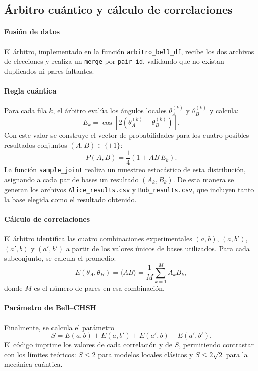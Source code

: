 \documentclass[11pt]{article}
\begin{document}
\subsection{Árbitro cuántico y cálculo de correlaciones}

\paragraph{Fusión de datos}
El árbitro, implementado en la función \texttt{arbitro\_bell\_df}, recibe los dos archivos de elecciones y realiza un \texttt{merge} por \texttt{pair\_id}, validando que no existan duplicados ni pares faltantes.

\paragraph{Regla cuántica}
Para cada fila $k$, el árbitro evalúa los ángulos locales $\theta_A^{(k)}$ y $\theta_B^{(k)}$ y calcula:
\[
E_k = \cos \left[ 2(\theta_A^{(k)} - \theta_B^{(k)}) \right].
\]
Con este valor se construye el vector de probabilidades para los cuatro posibles resultados conjuntos $(A,B) \in \{\pm1\}$:
\[
P(A,B) = \frac{1}{4} \left( 1 + AB \, E_k \right).
\]
La función \texttt{sample\_joint} realiza un muestreo estocástico de esta distribución, asignando a cada par de bases un resultado $(A_k, B_k)$. De esta manera se generan los archivos \texttt{Alice\_results.csv} y \texttt{Bob\_results.csv}, que incluyen tanto la base elegida como el resultado obtenido.

\paragraph{Cálculo de correlaciones}
El árbitro identifica las cuatro combinaciones experimentales $(a,b)$, $(a,b')$, $(a',b)$ y $(a',b')$ a partir de los valores únicos de bases utilizados. Para cada subconjunto, se calcula el promedio:
\[
E(\theta_A,\theta_B) = \langle A B \rangle = \frac{1}{M}\sum_{k=1}^M A_k B_k,
\]
donde $M$ es el número de pares en esa combinación.

\paragraph{Parámetro de Bell--CHSH}
Finalmente, se calcula el parámetro
\[
S = E(a,b) + E(a,b') + E(a',b) - E(a',b').
\]
El código imprime los valores de cada correlación y de $S$, permitiendo contrastar con los límites teóricos: $S \leq 2$ para modelos locales clásicos y $S \leq 2\sqrt{2}$ para la mecánica cuántica.
\end{document}

